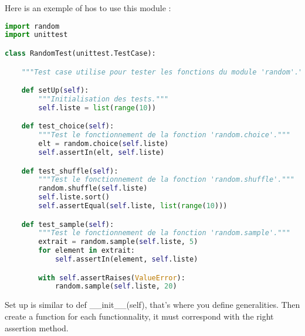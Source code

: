 \documentclass[a4paper, 12pt, titlepage]{scrartcl} %
\begin{document}
Here is an exemple of hos to use this module :
\begin{lstlisting}[language=Python]
import random
import unittest

class RandomTest(unittest.TestCase):

    """Test case utilise pour tester les fonctions du module 'random'."""

    def setUp(self):
        """Initialisation des tests."""
        self.liste = list(range(10))

    def test_choice(self):
        """Test le fonctionnement de la fonction 'random.choice'."""
        elt = random.choice(self.liste)
        self.assertIn(elt, self.liste)

    def test_shuffle(self):
        """Test le fonctionnement de la fonction 'random.shuffle'."""
        random.shuffle(self.liste)
        self.liste.sort()
        self.assertEqual(self.liste, list(range(10)))

    def test_sample(self):
        """Test le fonctionnement de la fonction 'random.sample'."""
        extrait = random.sample(self.liste, 5)
        for element in extrait:
            self.assertIn(element, self.liste)

        with self.assertRaises(ValueError):
            random.sample(self.liste, 20)
\end{lstlisting}
Set up is similar to def \_\_init\_\_(self), that's where you define generalities.
Then create a function for each functionnality, it must correspond with the right assertion method.
\end{document}
